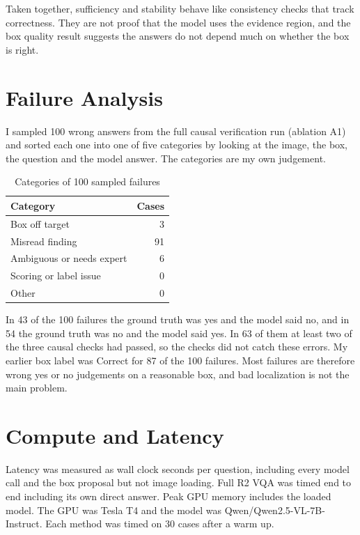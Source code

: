 \documentclass[11pt]{article}
\begin{document}
Taken together, sufficiency and stability behave like consistency checks that track correctness. They are not proof that the model
uses the evidence region, and the box quality result suggests the answers do not depend much on whether the box is right.

\section{Failure Analysis}
I sampled 100 wrong answers from the full causal verification run (ablation A1) and sorted each one into one of five categories by looking at the image, the box, the question and the model answer. The categories are my own judgement.

\begin{table}[h]
\centering
\caption{Categories of 100 sampled failures}
\begin{tabular}{lr}
\toprule
Category & Cases \\
\midrule
Box off target & 3 \\
Misread finding & 91 \\
Ambiguous or needs expert & 6 \\
Scoring or label issue & 0 \\
Other & 0 \\
\bottomrule
\end{tabular}
\end{table}

In 43 of the 100 failures the ground truth was yes and the model said no, and in 54 the ground truth was no and the model said yes. In 63 of them at least two of the three causal checks had passed, so the checks did not catch these errors. My earlier box label was Correct for 87 of the 100 failures. Most failures are therefore wrong yes or no judgements on a reasonable box, and bad localization is not the main problem.

\section{Compute and Latency}
Latency was measured as wall clock seconds per question, including every model call and the box proposal but not image loading. Full R2 VQA was timed end to end including its own direct answer. Peak GPU memory includes the loaded model. The GPU was Tesla T4 and the model was Qwen/Qwen2.5-VL-7B-Instruct. Each method was timed on 30 cases after a warm up.
\end{document}
